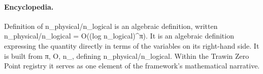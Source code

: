 \paragraph{Encyclopedia.}
Definition of n\_physical/n\_logical is an algebraic definition, written n\_physical/n\_logical = O((log n\_logical)\textasciicircum{}π). It is an algebraic definition expressing the quantity directly in terms of the variables on its right-hand side. It is built from π, O, n\_, defining n\_physical/n\_logical. Within the Trawin Zero Point registry it serves as one element of the framework's mathematical narrative.
